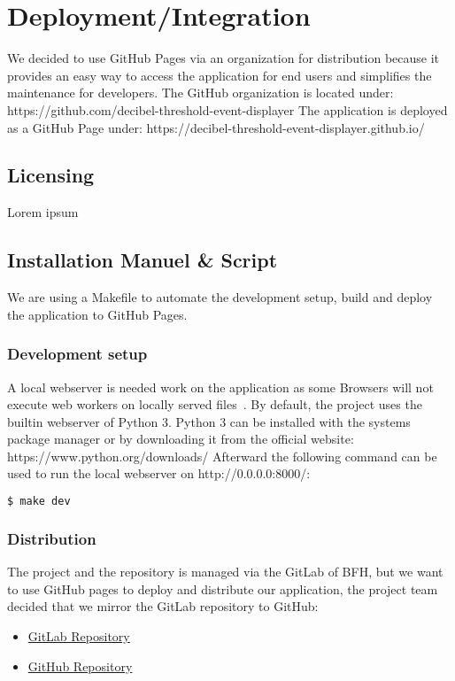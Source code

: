 \section{Deployment/Integration}
We decided to use GitHub Pages via an organization for distribution because it provides an easy way to access the
application for end users and simplifies the maintenance for developers.
The GitHub organization is located under: https://github.com/decibel-threshold-event-displayer
The application is deployed as a GitHub Page under: https://decibel-threshold-event-displayer.github.io/


\subsection{Licensing}
Lorem ipsum

\subsection{Installation Manuel \& Script}
We are using a Makefile to automate the development setup, build and deploy the application to GitHub Pages.

\subsubsection{Development setup}
A local webserver is needed work on the application as some Browsers will not execute web workers on locally served files~\cite{stackoverflow_chrome_cant_load_web_worker}.
By default, the project uses the builtin webserver of Python 3.
Python 3 can be installed with the systems package manager or by downloading it from the official website: https://www.python.org/downloads/
Afterward the following command can be used to run the local webserver on http://0.0.0.0:8000/:

\begin{lstlisting}[caption={Makefile: Start local webserver},label={lst:makefile_start_local_webserver},language=Bash]
$ make dev
\end{lstlisting}

\subsubsection{Distribution}
The project and the repository is managed via the GitLab of BFH,
but we want to use GitHub pages to deploy and distribute our application,
the project team decided that we mirror the GitLab repository to GitHub:
\begin{itemize}
    \item \href{https://gitlab.ti.bfh.ch/decibel-threshold-event-displayer/decibel-threshold-event-displayer}{GitLab Repository}
    \item \href{https://github.com/decibel-threshold-event-displayer/decibel-threshold-event-displayer.github.io}{GitHub Repository}
\end{itemize}


